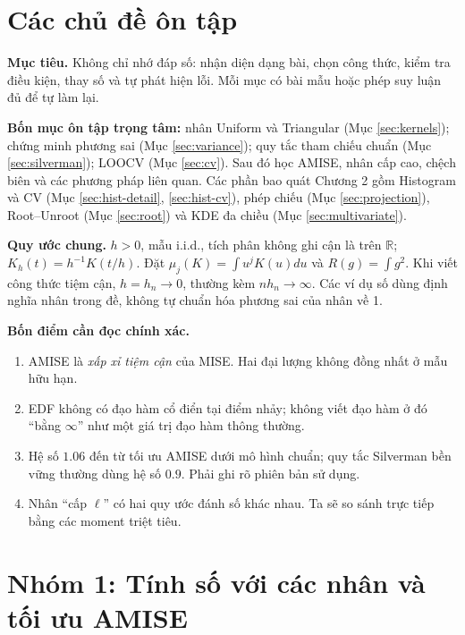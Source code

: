 \documentclass[11pt,a4paper]{article}
\newcommand{\R}{\mathbb R}
\newcommand{\buoc}[1]{\par\medskip\textbf{#1}\par}
\begin{document}
\clearpage
\section*{Các chủ đề ôn tập}
\textbf{Mục tiêu.} Không chỉ nhớ đáp số: nhận diện dạng bài, chọn công thức, kiểm tra điều kiện, thay số và tự phát hiện lỗi. Mỗi mục có bài mẫu hoặc phép suy luận đủ để tự làm lại.

\textbf{Bốn mục ôn tập trọng tâm:} nhân Uniform và Triangular (Mục \ref{sec:kernels}); chứng minh phương sai (Mục \ref{sec:variance}); quy tắc tham chiếu chuẩn (Mục \ref{sec:silverman}); LOOCV (Mục \ref{sec:cv}). Sau đó học AMISE, nhân cấp cao, chệch biên và các phương pháp liên quan. Các phần bao quát Chương 2 gồm Histogram và CV (Mục \ref{sec:hist-detail}, \ref{sec:hist-cv}), phép chiếu (Mục \ref{sec:projection}), Root--Unroot (Mục \ref{sec:root}) và KDE đa chiều (Mục \ref{sec:multivariate}).

\textbf{Quy ước chung.} $h>0$, mẫu i.i.d., tích phân không ghi cận là trên $\R$; $K_h(t)=h^{-1}K(t/h)$. Đặt $\mu_j(K)=\int u^jK(u)du$ và $R(g)=\int g^2$. Khi viết công thức tiệm cận, $h=h_n\to0$, thường kèm $nh_n\to\infty$. Các ví dụ số dùng định nghĩa nhân trong đề, không tự chuẩn hóa phương sai của nhân về 1.

\textbf{Bốn điểm cần đọc chính xác.}
\begin{enumerate}
\item AMISE là \emph{xấp xỉ tiệm cận} của MISE. Hai đại lượng không đồng nhất ở mẫu hữu hạn.
\item EDF không có đạo hàm cổ điển tại điểm nhảy; không viết đạo hàm ở đó ``bằng $\infty$'' như một giá trị đạo hàm thông thường.
\item Hệ số $1.06$ đến từ tối ưu AMISE dưới mô hình chuẩn; quy tắc Silverman bền vững thường dùng hệ số $0.9$. Phải ghi rõ phiên bản sử dụng.
\item Nhân ``cấp $\ell$'' có hai quy ước đánh số khác nhau. Ta sẽ so sánh trực tiếp bằng các moment triệt tiêu.
\end{enumerate}
\begingroup
\small
\tableofcontents
\endgroup
\setlength{\abovedisplayskip}{8pt}
\setlength{\belowdisplayskip}{8pt}
\setlength{\abovedisplayshortskip}{3pt}
\setlength{\belowdisplayshortskip}{4pt}
\renewcommand{\buoc}[1]{\par\smallskip\textbf{#1}\par\nopagebreak[4]}

\clearpage
\section{Nhóm 1: Tính số với các nhân và tối ưu AMISE}
\end{document}
